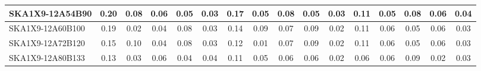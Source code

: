 \begin{table}[H]
{{\begin{tabular}{|lccccc||ccccc||ccccc|}
SKA1X9-12A54B90 & 0.20 \cellcolor{blue!60.00} & 0.08 \cellcolor{red!49.50} & 0.06 \cellcolor{green!39.00} & 0.05 \cellcolor{orange!28.50} & 0.03 \cellcolor{purple!39.00} & 0.17 \cellcolor{blue!60.00} & 0.05 \cellcolor{red!39.00} & 0.08 \cellcolor{green!60.00} & 0.05 \cellcolor{orange!18.00} & 0.03 \cellcolor{purple!60.00} & 0.11 \cellcolor{blue!60.00} & 0.05 \cellcolor{red!18.00} & 0.08 \cellcolor{green!49.50} & 0.06 \cellcolor{orange!60.00} & 0.04 \cellcolor{purple!28.50}\\ \hline 
SKA1X9-12A60B100 & 0.19 \cellcolor{blue!54.00} & 0.02 \cellcolor{red!18.00} & 0.04 \cellcolor{green!18.00} & 0.08 \cellcolor{orange!60.00} & 0.03 \cellcolor{purple!39.00} & 0.14 \cellcolor{blue!44.25} & 0.09 \cellcolor{red!60.00} & 0.07 \cellcolor{green!39.00} & 0.09 \cellcolor{orange!60.00} & 0.02 \cellcolor{purple!18.00} & 0.11 \cellcolor{blue!60.00} & 0.06 \cellcolor{red!32.00} & 0.05 \cellcolor{green!18.00} & 0.06 \cellcolor{orange!60.00} & 0.03 \cellcolor{purple!18.00}\\ \hline 
SKA1X9-12A72B120 & 0.15 \cellcolor{blue!30.00} & 0.10 \cellcolor{red!60.00} & 0.04 \cellcolor{green!18.00} & 0.08 \cellcolor{orange!60.00} & 0.03 \cellcolor{purple!39.00} & 0.12 \cellcolor{blue!33.75} & 0.01 \cellcolor{red!18.00} & 0.07 \cellcolor{green!39.00} & 0.09 \cellcolor{orange!60.00} & 0.02 \cellcolor{purple!18.00} & 0.11 \cellcolor{blue!60.00} & 0.06 \cellcolor{red!32.00} & 0.05 \cellcolor{green!18.00} & 0.06 \cellcolor{orange!60.00} & 0.03 \cellcolor{purple!18.00}\\ \hline 
SKA1X9-12A80B133 & 0.13 \cellcolor{blue!18.00} & 0.03 \cellcolor{red!23.25} & 0.06 \cellcolor{green!39.00} & 0.04 \cellcolor{orange!18.00} & 0.04 \cellcolor{purple!60.00} & 0.11 \cellcolor{blue!28.50} & 0.05 \cellcolor{red!39.00} & 0.06 \cellcolor{green!18.00} & 0.06 \cellcolor{orange!28.50} & 0.02 \cellcolor{purple!18.00} & 0.06 \cellcolor{blue!18.00} & 0.06 \cellcolor{red!32.00} & 0.09 \cellcolor{green!60.00} & 0.02 \cellcolor{orange!18.00} & 0.03 \cellcolor{purple!18.00}\\ \hline 
\end{tabular}}
\vspace{-0.300000cm}
\hspace{1cm} 
}
\end{table}
